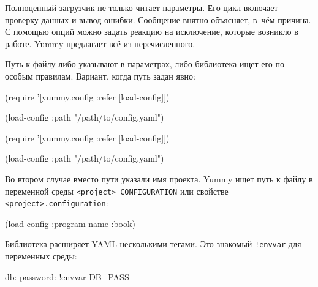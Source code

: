 Полноценный загрузчик не только читает параметры. Его цикл включает проверку данных
и вывод ошибки. Сообщение внятно объясняет, в~чём причина. С помощью опций можно
задать реакцию на исключение, которые возникло в работе. Yummy предлагает всё из
перечисленного.

Путь к файлу либо указывают в параметрах, либо библиотека ищет его по особым
правилам. Вариант, когда путь задан явно:

\ifnarrow

\begin{english}
  \begin{clojure}
(require
  '[yummy.config :refer [load-config]])

(load-config
  {:path "/path/to/config.yaml"})
  \end{clojure}
\end{english}

\else

\begin{english}
  \begin{clojure}
(require '[yummy.config :refer [load-config]])

(load-config {:path "/path/to/config.yaml"})
  \end{clojure}
\end{english}

\fi

Во втором случае вместо пути указали имя проекта. Yummy ищет путь к файлу в
переменной среды \verb|<project>_CONFIGURATION| или свойстве
\verb|<project>.configuration|:

\begin{english}
\end{english}

\begin{english}
  \begin{clojure}
(load-config {:program-name :book})
  \end{clojure}
\end{english}

Библиотека расширяет YAML несколькими тегами. Это знакомый \verb|!envvar|
для переменных среды:


\begin{english}
  \begin{yaml}
db:
  password: !envvar DB_PASS
  \end{yaml}
\end{english}

